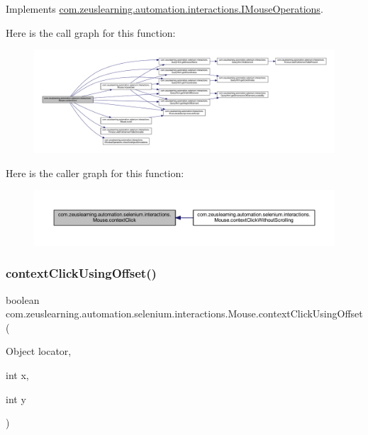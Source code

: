 Implements \hyperlink{interfacecom_1_1zeuslearning_1_1automation_1_1interactions_1_1IMouseOperations_aa9b50c75a45f8c91063ba22a985614ca}{com.\+zeuslearning.\+automation.\+interactions.\+I\+Mouse\+Operations}.

Here is the call graph for this function\+:
\nopagebreak
\begin{figure}[H]
\begin{center}
\leavevmode
\includegraphics[width=350pt]{d0/dfa/classcom_1_1zeuslearning_1_1automation_1_1selenium_1_1interactions_1_1Mouse_afdefed49a206fa9bfcc3dc3f088f8580_cgraph}
\end{center}
\end{figure}
Here is the caller graph for this function\+:
\nopagebreak
\begin{figure}[H]
\begin{center}
\leavevmode
\includegraphics[width=350pt]{d0/dfa/classcom_1_1zeuslearning_1_1automation_1_1selenium_1_1interactions_1_1Mouse_afdefed49a206fa9bfcc3dc3f088f8580_icgraph}
\end{center}
\end{figure}
\hypertarget{classcom_1_1zeuslearning_1_1automation_1_1selenium_1_1interactions_1_1Mouse_a7647f09737f1e72521682df0e4925ac6}{}\label{classcom_1_1zeuslearning_1_1automation_1_1selenium_1_1interactions_1_1Mouse_a7647f09737f1e72521682df0e4925ac6} 
\subsubsection{\texorpdfstring{context\+Click\+Using\+Offset()}{contextClickUsingOffset()}}
{\footnotesize\ttfamily boolean com.\+zeuslearning.\+automation.\+selenium.\+interactions.\+Mouse.\+context\+Click\+Using\+Offset (\begin{DoxyParamCaption}\item[{Object}]{locator,  }\item[{int}]{x,  }\item[{int}]{y }\end{DoxyParamCaption})\hspace{0.3cm}{\ttfamily [inline]}}

